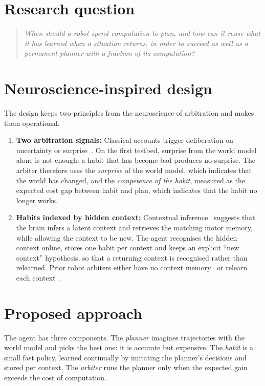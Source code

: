 \documentclass[11pt,a4paper]{article}
\begin{document}
\section{Research question}
\begin{quote}
\emph{When should a robot spend computation to plan, and how can it reuse what it has learned when a situation returns, in order to succeed as well as a permanent planner with a fraction of its computation?}
\end{quote}

\section{Neuroscience-inspired design}
The design keeps two principles from the neuroscience of arbitration and makes them operational.

\begin{enumerate}
\item \textbf{Two arbitration signals:} Classical accounts trigger deliberation on uncertainty or surprise~\cite{daw2005uncertainty}. On the first testbed, surprise from the world model alone is not enough: a habit that has become bad produces no surprise. The arbiter therefore uses the \emph{surprise} of the world model, which indicates that the world has changed, and the \emph{competence of the habit}, measured as the expected cost gap between habit and plan, which indicates that the habit no longer works.

\item \textbf{Habits indexed by hidden context:} Contextual inference~\cite{heald2021contextual} suggests that the brain infers a latent context and retrieves the matching motor memory, while allowing the context to be new. The agent recognises the hidden context online, stores one habit per context and keeps an explicit ``new context'' hypothesis, so that a returning context is recognised rather than relearned. Prior robot arbiters either have no context memory~\cite{labiosa2026when} or relearn each context~\cite{domberg2026selfadapting}.
\end{enumerate}

\section{Proposed approach}
The agent has three components. The \emph{planner} imagines trajectories with the world model and picks the best one: it is accurate but expensive. The \emph{habit} is a small fast policy, learned continually by imitating the planner's decisions and stored per context. The \emph{arbiter} runs the planner only when the expected gain exceeds the cost of computation.
\end{document}
